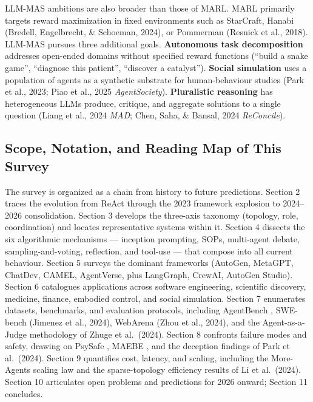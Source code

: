 \documentclass{article}
\begin{document}
LLM-MAS ambitions are also broader than those of MARL. MARL primarily targets reward maximization in fixed environments such as StarCraft, Hanabi (Bredell, Engelbrecht, \& Schoeman, 2024), or Pommerman (Resnick et al., 2018). LLM-MAS pursues three additional goals. \textbf{Autonomous task decomposition} addresses open-ended domains without specified reward functions (``build a snake game'', ``diagnose this patient'', ``discover a catalyst''). \textbf{Social simulation} uses a population of agents as a synthetic substrate for human-behaviour studies (Park et al., 2023; Piao et al., 2025 \emph{AgentSociety}). \textbf{Pluralistic reasoning} has heterogeneous LLMs produce, critique, and aggregate solutions to a single question (Liang et al., 2024 \emph{MAD}; Chen, Saha, \& Bansal, 2024 \emph{ReConcile}).

\subsection{Scope, Notation, and Reading Map of This Survey}\label{scope-notation-and-reading-map-of-this-survey}

The survey is organized as a chain from history to future predictions. Section 2 traces the evolution from ReAct \citep{yao2023reactsynergizingre} through the 2023 framework explosion to 2024--2026 consolidation. Section 3 develops the three-axis taxonomy (topology, role, coordination) and locates representative systems within it. Section 4 dissects the six algorithmic mechanisms --- inception prompting, SOPs, multi-agent debate, sampling-and-voting, reflection, and tool-use --- that compose into all current behaviour. Section 5 surveys the dominant frameworks (AutoGen, MetaGPT, ChatDev, CAMEL, AgentVerse, plus LangGraph, CrewAI, AutoGen Studio). Section 6 catalogues applications across software engineering, scientific discovery, medicine, finance, embodied control, and social simulation. Section 7 enumerates datasets, benchmarks, and evaluation protocols, including AgentBench \citep{liu20232023}, SWE-bench (Jimenez et al., 2024), WebArena (Zhou et al., 2024), and the Agent-as-a-Judge methodology of Zhuge et al.~(2024). Section 8 confronts failure modes and safety, drawing on PsySafe \citep{zhang2024psysafeacomprehens}, MAEBE \citep{erisken2025maebemultiagenteme}, and the deception findings of Park et al.~(2024). Section 9 quantifies cost, latency, and scaling, including the More-Agents scaling law and the sparse-topology efficiency results of Li et al.~(2024). Section 10 articulates open problems and predictions for 2026 onward; Section 11 concludes.
\end{document}
